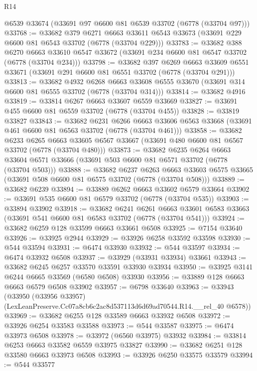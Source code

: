 \begin{lexlean}{R14}
\begin{coremodule}
    @6539
    @33674
    (@33691 @97 @6600 @81 @6539 @33702 (@6778 (@33704 @97)))
@33768 := @33682
    @379
    @6271
    @6663
    @33611
    @6543
    @33673
    (@33691 @229 @6600 @81 @6543 @33702 (@6778 (@33704 @229)))
@33783 := @33682
    @388
    @6270
    @6663
    @33610
    @6547
    @33672
    (@33691 @234 @6600 @81 @6547 @33702 (@6778 (@33704 @234)))
@33798 := @33682
    @397
    @6269
    @6663
    @33609
    @6551
    @33671
    (@33691 @291 @6600 @81 @6551 @33702 (@6778 (@33704 @291)))
@33813 := @33682
    @4932
    @6268
    @6663
    @33608
    @6555
    @33670
    (@33691 @314 @6600 @81 @6555 @33702 (@6778 (@33704 @314)))
@33814 := @33682 @4916
@33819 := @33814 @6267 @6663 @33607 @6559 @33669
@33827 := @33691 @455 @6600 @81 @6559 @33702 (@6778 (@33704 @455))
@33828 := @33819 @33827
@33843 := @33682
    @6231
    @6266
    @6663
    @33606
    @6563
    @33668
    (@33691 @461 @6600 @81 @6563 @33702 (@6778 (@33704 @461)))
@33858 := @33682
    @6233
    @6265
    @6663
    @33605
    @6567
    @33667
    (@33691 @480 @6600 @81 @6567 @33702 (@6778 (@33704 @480)))
@33873 := @33682
    @6235
    @6264
    @6663
    @33604
    @6571
    @33666
    (@33691 @503 @6600 @81 @6571 @33702 (@6778 (@33704 @503)))
@33888 := @33682
    @6237
    @6263
    @6663
    @33603
    @6575
    @33665
    (@33691 @508 @6600 @81 @6575 @33702 (@6778 (@33704 @508)))
@33889 := @33682 @6239
@33894 := @33889 @6262 @6663 @33602 @6579 @33664
@33902 := @33691 @535 @6600 @81 @6579 @33702 (@6778 (@33704 @535))
@33903 := @33894 @33902
@33918 := @33682
    @6241
    @6261
    @6663
    @33601
    @6583
    @33663
    (@33691 @541 @6600 @81 @6583 @33702 (@6778 (@33704 @541)))
@33924 := @33682 @6259 @128 @33599 @6663 @33661 @6508
@33925 := @7154 @33640
@33926 := @33925 @2944
@33929 := @33926 @6258 @33592 @33598
@33930 := @544 @33594
@33931 := @6474 @33930
@33932 := @544 @33597
@33934 := @6474 @33932 @6508
@33937 := @33929 (@33931 @33934) @33661
@33943 := @33682 @6245 @6257 @33570 @33591 @33930 @33934
@33950 := @33925 @3141 @6244 @6665 @33569 (@6580 @6508) @33930
@33956 := @33889 @128 @6663 @6663 @6579 @6508 @33902
@33957 := @6798 @33640
@33963 := @33943
    (@33950 (@33956 @33957) (LexLeanPreserve.Cc07a8cb6c2ac8d537113d6d69ad70544.R14.__rel_40 @6578))
@33969 := @33682 @6255 @128 @33589 @6663 @33932 @6508
@33972 := @33926 @6254 @33583 @33588
@33973 := @544 @33587
@33975 := @6474 @33973 @6508
@33978 := @33972 (@6560 @33975) @33932
@33984 := @33814 @6253 @6663 @33582 @6559 @33975 @33827
@33990 := @33682 @6251 @128 @33580 @6663 @33973 @6508
@33993 := @33926 @6250 @33575 @33579
@33994 := @544 @33577

\end{coremodule}
\end{lexlean}
